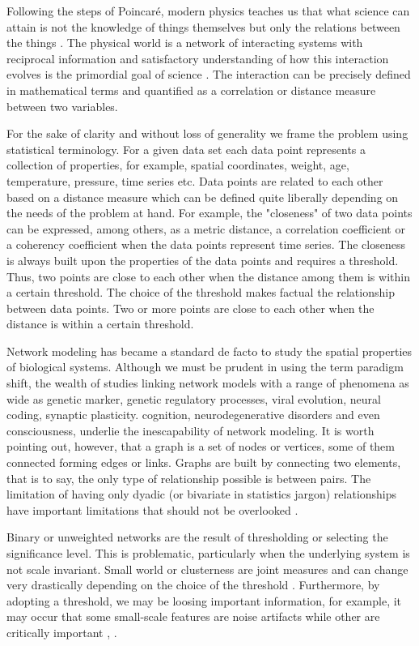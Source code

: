 \documentclass[onecollarge,runningheads]{svjour2}
\begin{document}
Following the steps of Poincar{\'e}, modern physics teaches us that what science can attain is not the knowledge of things themselves but only the relations between the things \cite{Poincare:1952}. The physical world is a network of interacting systems with reciprocal information and satisfactory understanding of how this interaction evolves is the primordial goal of science \cite{rovelli2015relative}.
The interaction can be precisely defined in mathematical terms and quantified as a correlation or distance measure between two variables.

For the sake of clarity and without loss of generality we frame the problem using statistical terminology.
For a given data set each data point represents a collection of properties, for example, spatial coordinates, weight, age, temperature, pressure, time series etc. Data points are related to each other based on a distance measure which can be defined quite liberally depending on the needs of the problem at hand. For example, the "closeness" of two data points can be expressed, among others, as a metric distance, a correlation coefficient or a coherency coefficient when the data points represent time series.
The closeness is always built upon the properties of the data points and requires a threshold. Thus, two points are close to each other when the distance among them is within a certain threshold. The choice of the threshold makes factual the relationship between data points. Two or more points are close to each other when the distance is within a certain threshold.

Network modeling has became a standard de facto to study the spatial properties of biological systems. 
Although we must be prudent in using the term paradigm shift, the wealth of studies linking network models with a range of phenomena as wide as genetic marker, genetic regulatory processes, viral evolution, neural coding, synaptic plasticity. cognition, neurodegenerative disorders and even consciousness, underlie the inescapability of network modeling.  
It is worth pointing out, however, that a graph is a set of nodes or vertices, some of them connected forming edges or links. Graphs are built by connecting two elements, that is to say, the only type of relationship possible is between pairs. The limitation of having only dyadic (or bivariate in statistics jargon) relationships have important limitations that should not be overlooked \cite{giusti2016two} .

Binary or unweighted networks are the result of thresholding or selecting the significance level. This is problematic, particularly when the underlying system is  not scale invariant. Small world or clusterness are joint measures and can change very drastically depending on the choice of the threshold \cite{toppi2012statistica}. Furthermore, by adopting a threshold, we may be loosing important information, for example, it may occur that some small-scale features are noise artifacts while other are critically important \cite{fallani2014graph}, \cite{papo2014complex}.
\end{document}
